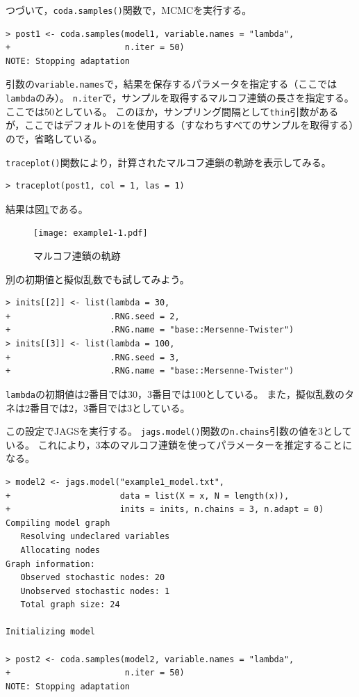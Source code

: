 \documentclass[11pt,uplatex]{jsarticle}
\begin{document}
つづいて，\texttt{coda.samples()}関数で，MCMCを実行する。
\begin{lstlisting}
> post1 <- coda.samples(model1, variable.names = "lambda",
+                       n.iter = 50)
NOTE: Stopping adaptation

\end{lstlisting}
%
引数の\texttt{variable.names}で，結果を保存するパラメータを指定する（ここでは\texttt{lambda}のみ）。
\texttt{n.iter}で，サンプルを取得するマルコフ連鎖の長さを指定する。ここでは50としている。
このほか，サンプリング間隔として\texttt{thin}引数があるが，ここではデフォルトの1を使用する（すなわちすべてのサンプルを取得する）ので，省略している。

\texttt{traceplot()}関数により，計算されたマルコフ連鎖の軌跡を表示してみる。
\begin{lstlisting}
> traceplot(post1, col = 1, las = 1)
\end{lstlisting}
%
結果は図\ref{fig:trace1}である。

\begin{figure}[hbtp]
  \begin{center}
    \texttt{[image: example1-1.pdf]}
  \end{center}
  \caption{マルコフ連鎖の軌跡}
  \label{fig:trace1}
\end{figure}

別の初期値と擬似乱数でも試してみよう。
\begin{lstlisting}
> inits[[2]] <- list(lambda = 30,
+                    .RNG.seed = 2,
+                    .RNG.name = "base::Mersenne-Twister")
> inits[[3]] <- list(lambda = 100,
+                    .RNG.seed = 3,
+                    .RNG.name = "base::Mersenne-Twister")
\end{lstlisting}
\texttt{lambda}の初期値は2番目では30，3番目では100としている。
また，擬似乱数のタネは2番目では2，3番目では3としている。

この設定で\textsf{JAGS}を実行する。
\texttt{jags.model()}関数の\texttt{n.chains}引数の値を3としている。
これにより，3本のマルコフ連鎖を使ってパラメーターを推定することになる。
\begin{lstlisting}
> model2 <- jags.model("example1_model.txt",
+                      data = list(X = x, N = length(x)),
+                      inits = inits, n.chains = 3, n.adapt = 0)
Compiling model graph
   Resolving undeclared variables
   Allocating nodes
Graph information:
   Observed stochastic nodes: 20
   Unobserved stochastic nodes: 1
   Total graph size: 24

Initializing model

> post2 <- coda.samples(model2, variable.names = "lambda",
+                       n.iter = 50)
NOTE: Stopping adaptation

\end{lstlisting}
\end{document}
